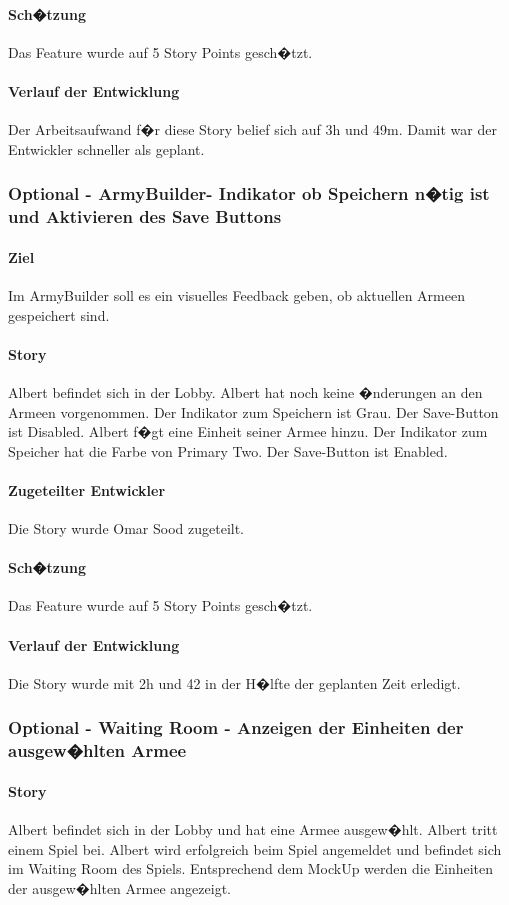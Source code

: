 \documentclass[12pt, titlepage]{scrartcl}
\begin{document}
			\paragraph{Sch�tzung}
			Das Feature wurde auf 5 Story Points gesch�tzt.
			\paragraph{Verlauf der Entwicklung} 
			Der Arbeitsaufwand f�r diese Story belief sich auf 3h und 49m. Damit war der Entwickler schneller als geplant.
			\subsubsection{Optional - ArmyBuilder- Indikator ob Speichern n�tig ist und Aktivieren des Save Buttons}
			\paragraph{Ziel} Im ArmyBuilder soll es ein visuelles Feedback geben, ob aktuellen Armeen gespeichert sind.
			\paragraph{Story} Albert befindet sich in der Lobby. Albert hat noch keine �nderungen an den Armeen vorgenommen. Der Indikator zum Speichern ist Grau. Der Save-Button ist Disabled. Albert f�gt eine Einheit seiner Armee hinzu. Der Indikator zum Speicher hat die Farbe von Primary Two. Der Save-Button ist Enabled.
			\paragraph{Zugeteilter Entwickler} Die Story wurde Omar Sood zugeteilt.
			\paragraph{Sch�tzung}
			Das Feature wurde auf 5 Story Points gesch�tzt.
			\paragraph{Verlauf der Entwicklung} 
			Die Story wurde mit 2h und 42 in der H�lfte der geplanten Zeit erledigt.
			\subsubsection{Optional - Waiting Room - Anzeigen der Einheiten der ausgew�hlten Armee}
			\paragraph{Story} Albert befindet sich in der Lobby und hat eine Armee ausgew�hlt. Albert tritt einem Spiel bei. Albert wird erfolgreich beim Spiel angemeldet und befindet sich im Waiting Room des Spiels. Entsprechend dem MockUp werden die Einheiten der ausgew�hlten Armee angezeigt.
\end{document}
